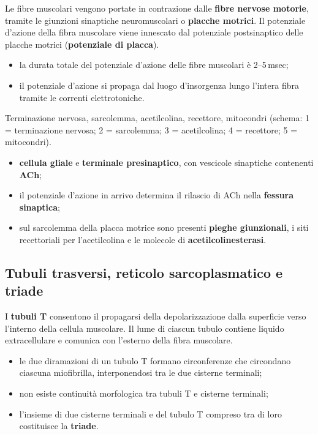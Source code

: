 Le fibre muscolari vengono portate in contrazione dalle \textbf{fibre nervose motorie}, tramite le giunzioni sinaptiche neuromuscolari o \textbf{placche motrici}. Il potenziale d'azione della fibra muscolare viene innescato dal potenziale postsinaptico delle placche motrici (\textbf{potenziale di placca}).
\begin{itemize}
  \item la durata totale del potenziale d'azione delle fibre muscolari è 2--5\,msec;
  \item il potenziale d'azione si propaga dal luogo d'insorgenza lungo l'intera fibra tramite le correnti elettrotoniche.
\end{itemize}

Terminazione nervosa, sarcolemma, acetilcolina, recettore, mitocondri (schema: 1 = terminazione nervosa; 2 = sarcolemma; 3 = acetilcolina; 4 = recettore; 5 = mitocondri).

\begin{itemize}
  \item \textbf{cellula gliale} e \textbf{terminale presinaptico}, con vescicole sinaptiche contenenti \textbf{ACh};
  \item il potenziale d'azione in arrivo determina il rilascio di ACh nella \textbf{fessura sinaptica};
  \item sul sarcolemma della placca motrice sono presenti \textbf{pieghe giunzionali}, i siti recettoriali per l'acetilcolina e le molecole di \textbf{acetilcolinesterasi}.
\end{itemize}

\subsection{Tubuli trasversi, reticolo sarcoplasmatico e triade}

I \textbf{tubuli T} consentono il propagarsi della depolarizzazione dalla superficie verso l'interno della cellula muscolare. Il lume di ciascun tubulo contiene liquido extracellulare e comunica con l'esterno della fibra muscolare.
\begin{itemize}
  \item le due diramazioni di un tubulo T formano circonferenze che circondano ciascuna miofibrilla, interponendosi tra le due cisterne terminali;
  \item non esiste continuità morfologica tra tubuli T e cisterne terminali;
  \item l'insieme di due cisterne terminali e del tubulo T compreso tra di loro costituisce la \textbf{triade}.
\end{itemize}

